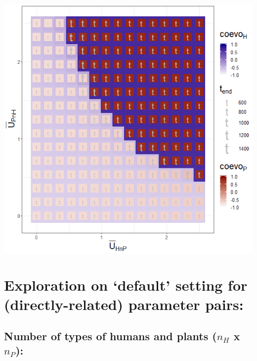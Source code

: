 \documentclass[]{book}
\begin{document}
\includegraphics[width=1\linewidth]{plots/3_twoPar-mU.HnP-mU.PnH_plot}

\newpage

\hypertarget{exploration-on-default-setting-for-directly-related-parameter-pairs}{%
\section{Exploration on `default' setting for (directly-related) parameter pairs:}\label{exploration-on-default-setting-for-directly-related-parameter-pairs}}

\hypertarget{number-of-types-of-humans-and-plants-n_h-x-n_p}{%
\subsection{\texorpdfstring{Number of types of humans and plants (\(n_{H}\) x \(n_{P}\)):}{Number of types of humans and plants (n\_\{H\} x n\_\{P\}):}}\label{number-of-types-of-humans-and-plants-n_h-x-n_p}}
\end{document}
